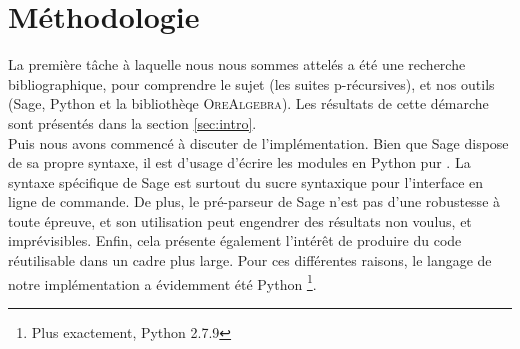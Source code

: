 \documentclass[12pt]{article}
\begin{document}

\section{Méthodologie}
    \label{sec:methodo}
    \par La première tâche à laquelle nous nous sommes attelés a été une recherche bibliographique,
    pour comprendre le sujet (les suites p-récursives), et nos outils (Sage, Python et la 
    bibliothèqe \textsc{OreAlgebra}).
    Les résultats de cette démarche sont présentés dans la section \ref{sec:intro}.\\
    Puis nous avons commencé à discuter de l'implémentation. Bien que Sage dispose de sa propre
    syntaxe, il est d'usage d'écrire les modules en \og Python pur \fg. La syntaxe spécifique
    de Sage est surtout du sucre syntaxique pour l'interface en ligne de
    commande. De plus, le pré-parseur de Sage n'est pas d'une robustesse à toute épreuve,
    et son utilisation peut engendrer des résultats non voulus, et imprévisibles. Enfin, 
    cela présente également l'intérêt de produire du code réutilisable dans un cadre plus large.
    Pour ces différentes raisons, le langage de notre implémentation a évidemment été Python
    \footnote{Plus exactement, Python 2.7.9}.
\end{document}
